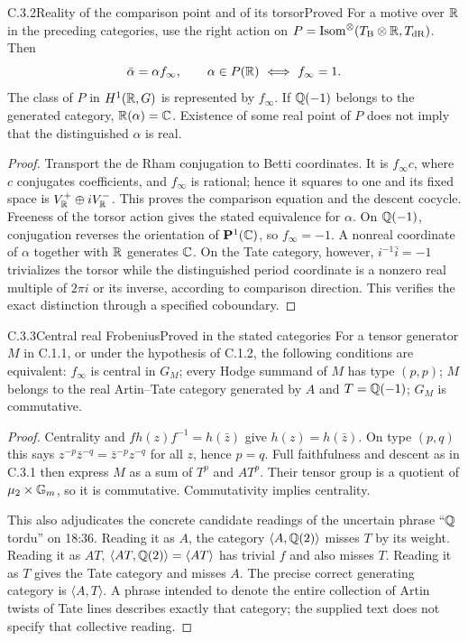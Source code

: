 \begin{result}{C.3.2}{Reality of the comparison point and of its torsor}{Proved}
For a motive over $\mathbb R$ in the preceding categories, use the right action on $P=\operatorname{Isom}^\otimes(T_{\mathrm B}\otimes\mathbb R,T_{\mathrm{dR}})$. Then
\[
 \bar\alpha=\alpha f_\infty,
 \qquad
 \alpha\in P(\mathbb R)\ \Longleftrightarrow\ f_\infty=1.
\]
The class of $P$ in $H^1(\mathbb R,G)$ is represented by $f_\infty$. If $\mathbb Q(-1)$ belongs to the generated category, $\mathbb R(\alpha)=\mathbb C$. Existence of some real point of $P$ does not imply that the distinguished $\alpha$ is real.
\end{result}
\begin{proof}
Transport the de Rham conjugation to Betti coordinates. It is $f_\infty c$, where $c$ conjugates coefficients, and $f_\infty$ is rational; hence it squares to one and its fixed space is $V^+_\mathbb R\oplus iV^-_\mathbb R$. This proves the comparison equation and the descent cocycle. Freeness of the torsor action gives the stated equivalence for $\alpha$. On $\mathbb Q(-1)$, conjugation reverses the orientation of $\mathbf P^1(\mathbb C)$, so $f_\infty=-1$. A nonreal coordinate of $\alpha$ together with $\mathbb R$ generates $\mathbb C$. On the Tate category, however, $i^{-1}\bar i=-1$ trivializes the torsor while the distinguished period coordinate is a nonzero real multiple of $2\pi i$ or its inverse, according to comparison direction. This verifies the exact distinction through a specified coboundary.
\end{proof}

\begin{result}{C.3.3}{Central real Frobenius}{Proved in the stated categories}
For a tensor generator $M$ in C.1.1, or under the hypothesis of C.1.2, the following conditions are equivalent: $f_\infty$ is central in $G_M$; every Hodge summand of $M$ has type $(p,p)$; $M$ belongs to the real Artin--Tate category generated by $A$ and $T=\mathbb Q(-1)$; $G_M$ is commutative.
\end{result}
\begin{proof}
Centrality and $f h(z)f^{-1}=h(\bar z)$ give $h(z)=h(\bar z)$. On type $(p,q)$ this says $z^{-p}\bar z^{-q}=\bar z^{-p}z^{-q}$ for all $z$, hence $p=q$. Full faithfulness and descent as in C.3.1 then express $M$ as a sum of $T^p$ and $A T^p$. Their tensor group is a quotient of $\mu_2\times\mathbb G_m$, so it is commutative. Commutativity implies centrality.

This also adjudicates the concrete candidate readings of the uncertain phrase ``$\mathbb Q$ tordu'' on 18:36. Reading it as $A$, the category $\langle A,\mathbb Q(2)\rangle$ misses $T$ by its weight. Reading it as $AT$, $\langle AT,\mathbb Q(2)\rangle=\langle AT\rangle$ has trivial $f$ and also misses $T$. Reading it as $T$ gives the Tate category and misses $A$. The precise correct generating category is $\langle A,T\rangle$. A phrase intended to denote the entire collection of Artin twists of Tate lines describes exactly that category; the supplied text does not specify that collective reading.
\end{proof}

